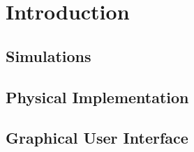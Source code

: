 
\section{Introduction}
\subsection{Simulations}

\subsection{Physical Implementation}


\subsection{Graphical User Interface}


